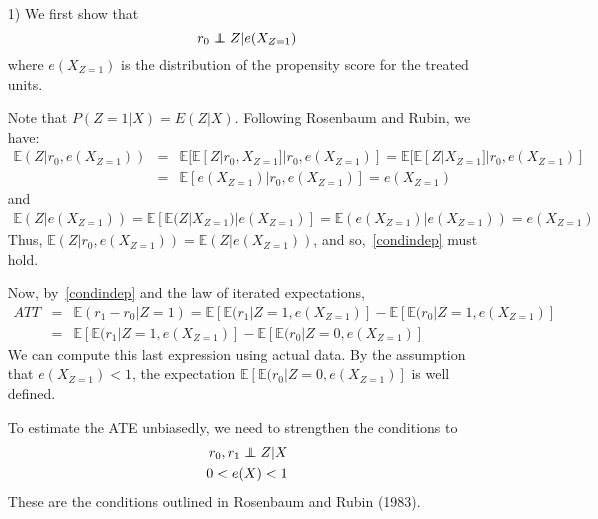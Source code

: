 \documentclass{article}
\newcommand\independent{\protect\mathpalette{\protect\independenT}{\perp}}
\def\independenT#1#2{\mathrel{\rlap{$#1#2$}\mkern2mu{#1#2}}}
\def\E{{\mathbb E}}
\begin{document}
\begin{itemize}
  \item[1)]
   We first show that 
   \begin{equation}
     r_0 \independent Z | e(X_{Z=1})
     \label{condindep}
   \end{equation}
   where $e(X_{Z=1})$ is the distribution of the propensity score for the treated units.
   
   Note that 
   $P(Z=1|X) = E(Z|X)$.
   Following Rosenbaum and Rubin, we have:
   \begin{eqnarray*}
     \E(Z  | r_0, e(X_{Z=1})) & = & \E[\E[Z | r_0, X_{Z=1}] | r_0, e(X_{Z=1}) ]
     = \E[\E[Z | X_{Z=1}] | r_0, e(X_{Z=1}) ]\\
     &=& \E[e(X_{Z=1})|r_0, e(X_{Z=1})] = e(X_{Z=1})
   \end{eqnarray*}
   and
   \begin{eqnarray*}
     \E(Z | e(X_{Z=1})) = \E[\E(Z | X_{Z=1})| e(X_{Z=1})] = \E(e(X_{Z=1})| e(X_{Z=1})) = e(X_{Z=1})
   \end{eqnarray*}
   Thus, $\E(Z  | r_0, e(X_{Z=1})) = \E(Z  |  e(X_{Z=1}))$, and so,~\eqref{condindep} must hold.
   
   Now, by~\eqref{condindep} and the law of iterated expectations,
   \begin{eqnarray*}
     ATT &=& \E(r_1 - r_0 | Z= 1) = \E[\E(r_1|Z = 1, e(X_{Z=1})] - \E[\E(r_0|Z = 1, e(X_{Z=1})] \\
       &=& \E[\E(r_1|Z = 1, e(X_{Z=1})] - \E[\E(r_0|Z = 0, e(X_{Z=1})] 
   \end{eqnarray*}
   We can compute this last expression using actual data.
   By the assumption that $e(X_{Z=1}) < 1$, the
   expectation $\E[\E(r_0|Z = 0, e(X_{Z=1})]$ is well defined.
   
   To estimate the ATE unbiasedly, we need to strengthen the conditions to
   \begin{eqnarray*}
     r_0, r_1 \independent Z | X \\
     0 < e(X) < 1
   \end{eqnarray*}
   These are the conditions outlined in Rosenbaum and Rubin (1983).
   \end{itemize}     
\end{document}
